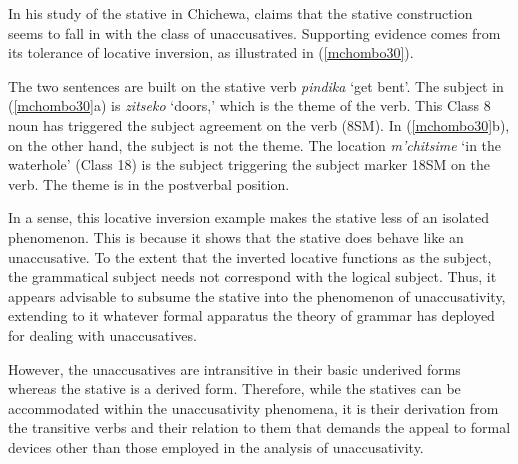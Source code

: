 \documentclass[output=paper]{langscibook}
\begin{document}
In his study of the stative in Chichewa, \citet{Mchombo:1993aa} claims that the stative construction seems to fall in with the class of unaccusatives. Supporting evidence comes from its tolerance of locative inversion, as illustrated in (\ref{mchombo30}). 

\begin{exe}
\ex\label{mchombo30}\citep[18]{Mchombo:1993aa}
\begin{xlist}
\end{xlist}
\end{exe}

The two sentences are built on the stative verb \textit{pindika} `get bent'. The subject in (\ref{mchombo30}a) is \textit{zitseko} `doors,' which is the theme of the verb. This Class 8 noun has triggered the subject agreement on the verb (8SM). In (\ref{mchombo30}b), on the other hand, the subject is not the theme. The location \textit{m'chitsime} `in the waterhole'  (Class 18) is the subject triggering the subject marker 18SM on the verb. The theme is in the postverbal position.  
 
In a sense, this locative inversion example makes the stative less of an isolated phenomenon. This is because it shows that the stative does behave like an unaccusative. To the extent that the inverted locative functions as the subject, the grammatical subject needs not correspond with the logical subject. Thus, it appears advisable to subsume the stative into the phenomenon of unaccusativity, extending to it whatever formal apparatus the theory of grammar has deployed for dealing with unaccusatives. 
 
However, the unaccusatives are intransitive in their basic underived forms whereas the stative is a derived form. Therefore, while the statives can be accommodated within the unaccusativity phenomena, it is their derivation from the transitive verbs and their relation to them that demands the appeal to formal devices other than those employed in the analysis of unaccusativity. 
\end{document}
